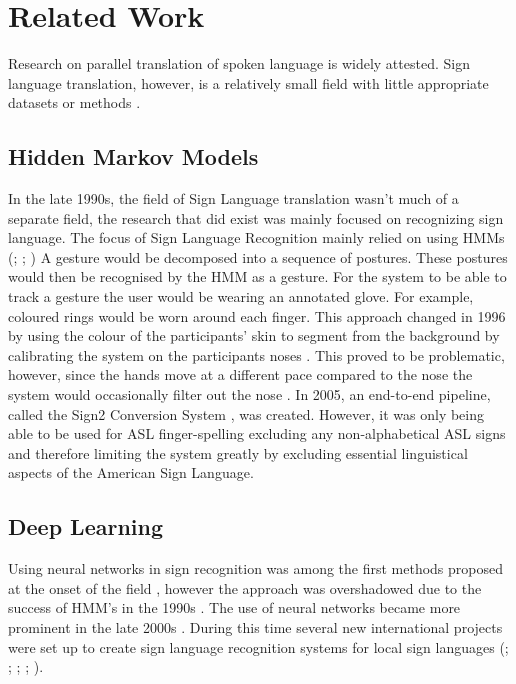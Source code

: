 \section{Related Work}

Research on parallel translation of spoken language is widely attested. Sign language translation, however, is a relatively small field with little appropriate datasets or methods \cite{camgoz2021content4all} \cite{bragg2019sign}.

\subsection{Hidden Markov Models}
In the late 1990s, the field of Sign Language translation wasn't much of a separate field, the research that did exist was mainly focused on recognizing sign language. The focus of Sign Language Recognition mainly relied on using HMMs (\citealp{hiddenmarkov1l}; \citealp{hiddenmarkov2}; \citealp{hiddenmarkov3}) \cite{holden2005australian} A gesture would be decomposed into a sequence of postures. These postures would then be recognised by the HMM as a gesture. For the system to be able to track a gesture the user would be wearing an annotated glove. For example, coloured rings would be worn around each finger. This approach changed in 1996 by using the colour of the participants' skin to segment from the background by calibrating the system on the participants noses \cite{starner1998real}. This proved to be problematic, however, since the hands move at a different pace compared to the nose the system would occasionally filter out the nose \cite{starner1998real}. In 2005, an end-to-end pipeline, called the Sign2 Conversion System \cite{glenn2005image}, was created. However, it was only being able to be used for ASL finger-spelling excluding any non-alphabetical ASL signs and therefore limiting the system greatly by excluding essential linguistical aspects of the American Sign Language.

\subsection{Deep Learning}

Using neural networks in sign recognition was among the first methods proposed at the onset of the field \cite{murakami1991gesture} \cite{fels1993glove}, however the approach was overshadowed due to the success of HMM's in the 1990s \cite{cooper2011sign}. The use of neural networks became more prominent in the late 2000s \cite{parton2006sign}. During this time several new international projects were set up to create sign language recognition systems for local sign languages (\citealp{ethopia}; \citealp{malaysia}; \citealp{persia}; \citealp{brazil}; \citealp{arabia}). 

